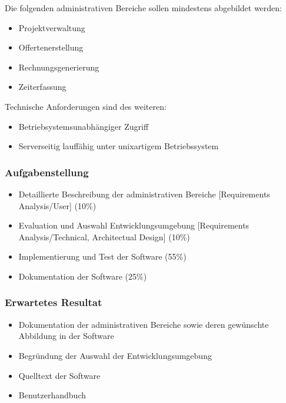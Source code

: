 Die folgenden administrativen Bereiche sollen mindestens abgebildet werden:
\begin{itemize}
\item Projektverwaltung
\item Offertenerstellung
\item Rechnungsgenerierung
\item Zeiterfassung
\end{itemize}
Technische Anforderungen sind des weiteren:
\begin{itemize}
\item Betriebsystemsunabhängiger Zugriff
\item Serverseitig lauffähig unter unixartigem Betriebssystem
\end{itemize}
\subsubsection{Aufgabenstellung}
\label{aufgabenstellung}
\begin{itemize}
\item Detaillierte Beschreibung der administrativen Bereiche [Requirements Analysis/User] (10\%)
\item Evaluation und Auswahl Entwicklungsumgebung [Requirements Analysis/Technical, Architectual Design] (10\%)
\item Implementierung und Test der Software (55\%)
\item Dokumentation der Software (25\%)
\end{itemize}
\subsubsection{Erwartetes Resultat}
\begin{itemize}
\item Dokumentation der administrativen Bereiche sowie deren gewünschte Abbildung in der Software
\item Begründung der Auswahl der Entwicklungsumgebung
\item Quelltext der Software 
\item Benutzerhandbuch
\end{itemize}
